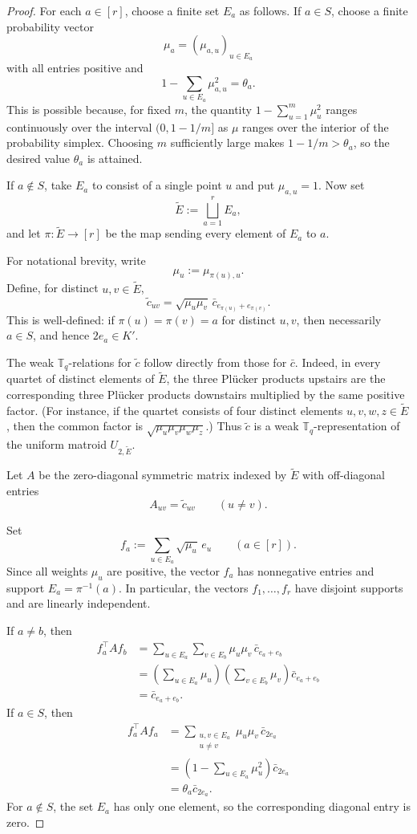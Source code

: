 \documentclass[12pt]{amsart}
\theoremstyle{definition}
\newcommand{\1}{\mathbf{1}}
\newcommand\T{{\mathbb T}}
\begin{document}
\begin{proof}
For each $a\in [r]$, choose a finite set $E_a$ as follows.  If $a\in S$,
choose a finite probability vector
\[
\mu_a=(\mu_{a,u})_{u\in E_a}
\]
with all entries positive and
\[
1-\sum_{u\in E_a}\mu_{a,u}^2=\theta_a.
\]
This is possible because, for fixed $m$, the quantity
$1-\sum_{u=1}^m \mu_u^2$
ranges continuously over the interval $(0,1-1/m]$ as $\mu$ ranges over the
interior of the probability simplex.  Choosing $m$ sufficiently large makes
$1-1/m>\theta_a$, so the desired value $\theta_a$ is attained.

If $a\notin S$, take $E_a$ to consist of a single point $u$ and put
$\mu_{a,u}=1$.  Now set
\[
        \widetilde E:=\bigsqcup_{a=1}^r E_a,
\]
and let $\pi:\widetilde E\to [r]$
be the map sending every element of $E_a$ to $a$.

For notational brevity, write
\[
        \mu_u:=\mu_{\pi(u),u}.
\]
Define, for distinct $u,v\in \widetilde E$,
\[
\widetilde c_{uv}
=
\sqrt{\mu_u\mu_v}\,
\bar c_{e_{\pi(u)}+e_{\pi(v)}}.
\]
This is well-defined: if $\pi(u)=\pi(v)=a$ for distinct $u,v$, then
necessarily $a\in S$, and hence $2e_a\in K'$.

The weak $\T_q$-relations for $\widetilde c$ follow directly from those for
$\bar c$.  Indeed, in every quartet of distinct elements of $\widetilde E$, the
three Pl\"ucker products upstairs are the corresponding three Pl\"ucker
products downstairs multiplied by the same positive factor.  
(For instance, if the quartet consists of four distinct elements $u,v,w,z\in \widetilde E$, then the common
factor is $\sqrt{\mu_u\mu_v\mu_w\mu_z}$.)
Thus $\widetilde c$ is a weak $\T_q$-representation of the uniform matroid
$U_{2,\widetilde E}$.

Let $A$ be the zero-diagonal symmetric matrix indexed by $\widetilde E$ with
off-diagonal entries
\[
 A_{uv}=\widetilde c_{uv}\qquad(u\ne v).
\]

Set
\[
        f_a:=\sum_{u\in E_a}\sqrt{\mu_u}\,e_u
        \qquad(a\in [r]).
\]
Since all weights $\mu_u$ are positive, the vector $f_a$ has nonnegative
entries and support $E_a=\pi^{-1}(a)$.  In particular, the vectors
$f_1,\ldots,f_r$ have disjoint supports and are linearly independent.

If
$a\ne b$, then
\[
\begin{aligned}
f_a^\top A f_b
&=
\sum_{u\in E_a}
\sum_{v\in E_b}
\mu_u\mu_v\,\bar c_{e_a+e_b}  \\
&=
\left(\sum_{u\in E_a}\mu_u\right)
\left(\sum_{v\in E_b}\mu_v\right)
\bar c_{e_a+e_b} \\
&=
\bar c_{e_a+e_b}.
\end{aligned}
\]
If $a\in S$, then
\[
\begin{aligned}
f_a^\top A f_a
&=
\sum_{\substack{u,v\in E_a\\u\ne v}}
\mu_u\mu_v\,\bar c_{2e_a} \\
&=
\left(1-\sum_{u\in E_a}\mu_u^2\right)\bar c_{2e_a} \\
&=
\theta_a\bar c_{2e_a}.
\end{aligned}
\]
For $a\notin S$, the set $E_a$ has only one element, so the corresponding
diagonal entry is zero.


\end{proof}
\end{document}
